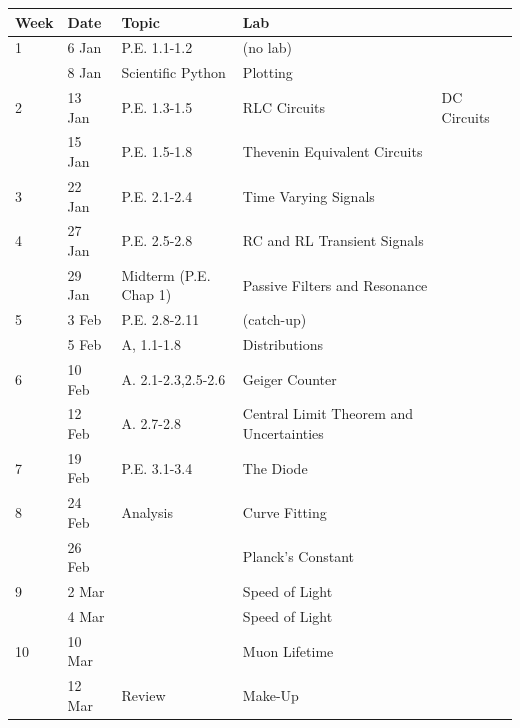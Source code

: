 \documentclass[12pt]{article}
\begin{document}
\begin{table}[h!]
\normalsize %
\begin{tabular}{ lllll }
\hline
\textbf{Week} & \textbf{Date} & \textbf{Topic} & \textbf{Lab} \\
\hline
1 & 6 Jan & P.E. 1.1-1.2 & (no lab) \\
   & 8 Jan & Scientific Python & Plotting\\
\hline
2 & 13 Jan & P.E. 1.3-1.5 & RLC Circuits & DC Circuits \\
  & 15 Jan & P.E. 1.5-1.8 & Thevenin Equivalent Circuits \\
\hline
3 & 22 Jan & P.E. 2.1-2.4 & Time Varying Signals \\
\hline
4 & 27 Jan & P.E. 2.5-2.8 & RC and RL Transient Signals \\
  & 29 Jan & Midterm (P.E. Chap 1) & Passive Filters and Resonance \\
\hline
5 & 3 Feb & P.E. 2.8-2.11 & (catch-up) \\
  & 5 Feb & A, 1.1-1.8 & Distributions \\
\hline
6 & 10 Feb & A. 2.1-2.3,2.5-2.6  & Geiger Counter \\
  & 12 Feb & A. 2.7-2.8 & Central Limit Theorem and Uncertainties \\
\hline
7 & 19 Feb & P.E. 3.1-3.4 & The Diode\\
\hline
8 & 24 Feb & Analysis & Curve Fitting \\
  & 26 Feb & & Planck's Constant \\
\hline
9 & 2 Mar & & Speed of Light \\
  & 4 Mar & & Speed of Light \\
\hline
10 & 10 Mar &  & Muon Lifetime\\
   & 12 Mar & Review & Make-Up \\
\hline
\end{tabular} 
\end{table}
\end{document}
